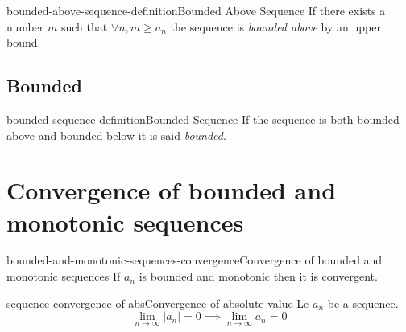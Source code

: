\documentclass[preview]{standalone}
\begin{document}
\begin{snippetdefinition}{bounded-above-sequence-definition}{Bounded Above Sequence}{
    If there exists a number \(m\) such that \(\forall n, m \geq a_n\)
    the sequence is \textit{bounded above} by an upper bound.
}
\end{snippetdefinition}

\subsection{Bounded}

\begin{snippetdefinition}{bounded-sequence-definition}{Bounded Sequence}{
    If the sequence is both bounded above and bounded below it is
    said \textit{bounded}.
}
\end{snippetdefinition}

\section{Convergence of bounded and monotonic sequences}

\begin{snippettheorem}{bounded-and-monotonic-sequences-convergence}{Convergence of bounded and monotonic sequences}{
    If \(a_n\) is bounded and monotonic then it is convergent.
}
\end{snippettheorem}

\begin{snippettheorem}{sequence-convergence-of-abs}{Convergence of absolute value}{
    Le \(a_n\) be a sequence.
    \[ \lim_{n\to\infty} |a_n| = 0 \implies \lim_{n\to\infty} a_n = 0 \]
}
\end{snippettheorem}

\end{document}
